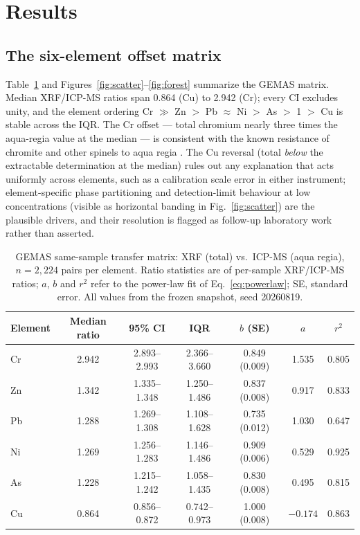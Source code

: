 \documentclass[11pt]{article}
\begin{document}
\section{Results}

\subsection{The six-element offset matrix}
\label{sec:matrix}
Table~\ref{tab:gemas} and Figures~\ref{fig:scatter}--\ref{fig:forest}
summarize the GEMAS matrix. Median XRF/ICP-MS ratios span 0.864 (Cu) to
2.942 (Cr); every CI excludes unity, and the element ordering
Cr $\gg$ Zn $>$ Pb $\approx$ Ni $>$ As $>$ 1 $>$ Cu is stable across the
IQR. The Cr offset --- total chromium nearly three times the aqua-regia
value at the median --- is consistent with the known resistance of chromite
and other spinels to aqua regia \cite{devos2006}. The Cu reversal (total
\emph{below} the extractable determination at the median) rules out any
explanation that acts uniformly across elements, such as a calibration
scale error in either instrument; element-specific phase partitioning and
detection-limit behaviour at low concentrations (visible as horizontal
banding in Fig.~\ref{fig:scatter}) are the plausible drivers, and their
resolution is flagged as follow-up laboratory work rather than asserted.

\begin{table}[!t]
\centering
\caption{GEMAS same-sample transfer matrix: XRF (total) vs.\ ICP-MS
(aqua regia), $n{=}2{,}224$ pairs per element. Ratio statistics are of
per-sample XRF/ICP-MS ratios; $a$, $b$ and $r^2$ refer to the power-law fit
of Eq.~\ref{eq:powerlaw}; SE, standard error. All values from the frozen
snapshot, seed 20260819.}
\label{tab:gemas}
\small
\begin{tabular}{lcccccc}
\toprule
Element & Median ratio & 95\% CI & IQR & $b$ (SE) & $a$ & $r^2$ \\
\midrule
Cr & 2.942 & 2.893--2.993 & 2.366--3.660 & 0.849 (0.009) & 1.535 & 0.805 \\
Zn & 1.342 & 1.335--1.348 & 1.250--1.486 & 0.837 (0.008) & 0.917 & 0.833 \\
Pb & 1.288 & 1.269--1.308 & 1.108--1.628 & 0.735 (0.012) & 1.030 & 0.647 \\
Ni & 1.269 & 1.256--1.283 & 1.146--1.486 & 0.909 (0.006) & 0.529 & 0.925 \\
As & 1.228 & 1.215--1.242 & 1.058--1.435 & 0.830 (0.008) & 0.495 & 0.815 \\
Cu & 0.864 & 0.856--0.872 & 0.742--0.973 & 1.000 (0.008) & $-0.174$ & 0.863 \\
\bottomrule
\end{tabular}
\end{table}
\end{document}
